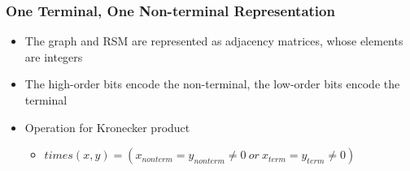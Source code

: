 \documentclass[x11names,dvipsnames,table]{beamer}
\begin{document}
\begin{frame}
  \transwipe[direction=90]
  \frametitle{One Terminal, One Non-terminal Representation}
  \begin{itemize}
    \item The graph and RSM are represented as adjacency matrices, whose elements are integers
    \item The high-order bits encode the non-terminal, the low-order bits encode the terminal \\
  \end{itemize}
  \begin{itemize}
    \item Operation for Kronecker product
    \begin{itemize}
        \item $times(x, y) = (x_{nonterm} = y_{nonterm} \neq 0 \ or\ x_{term} = y_{term} \neq 0)$
    \end{itemize}
  \end{itemize}
\end{frame}
\end{document}
